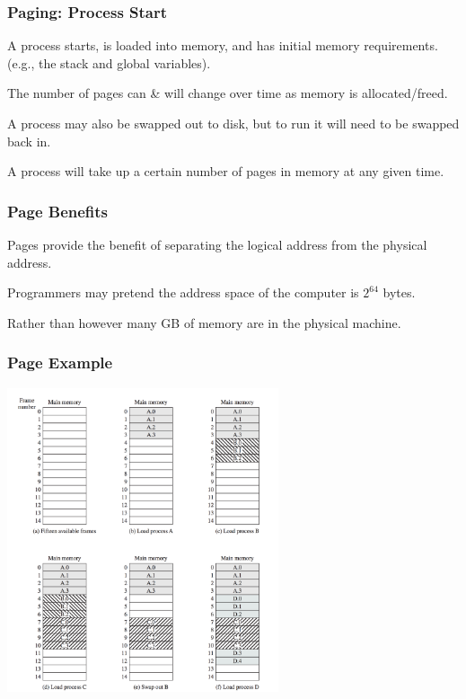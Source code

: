\begin{frame}
\frametitle{Paging: Process Start}

A process starts, is loaded into memory, and has initial memory requirements. \\
\quad (e.g., the stack and global variables).

The number of pages can \& will change over time as memory is allocated/freed. 

A process may also be swapped out to disk, but to run it will need to be swapped back in. 

A process will take up a certain number of pages in memory at any given time.

\end{frame}

\begin{frame}
\frametitle{Page Benefits}

Pages provide the benefit of separating the logical address from the physical address.

Programmers may pretend the address space of the computer is $2^{64}$ bytes.

Rather than however many GB of memory are in the physical machine. 

\end{frame}

\begin{frame}
\frametitle{Page Example}

\begin{center}
\includegraphics[width=0.6\textwidth]{images/loading-pages.png}
\end{center}


\end{frame}

